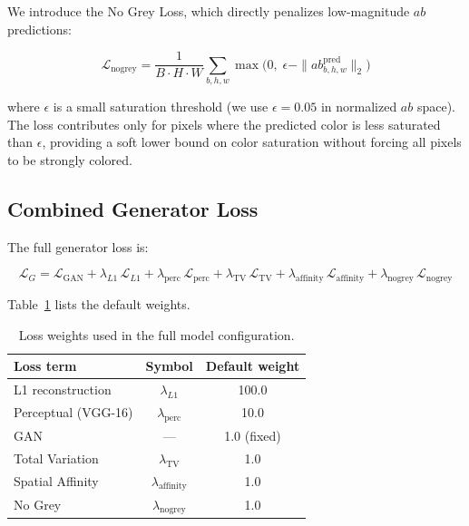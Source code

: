 \documentclass[12pt, a4paper, oneside]{report}
\begin{document}
    We introduce the No Grey Loss, which directly penalizes low-magnitude $ab$
    predictions:

    \begin{equation}
        \mathcal{L}_{\text{nogrey}} =
        \frac{1}{B \cdot H \cdot W}
        \sum_{b,h,w} \max\bigl(0,\; \epsilon - \|ab^{\text{pred}}_{b,h,w}\|_2\bigr)
    \end{equation}

    where $\epsilon$ is a small saturation threshold (we use $\epsilon = 0.05$ in
    normalized $ab$ space). The loss contributes only for pixels where the predicted
    color is less saturated than $\epsilon$, providing a soft lower bound on color
    saturation without forcing all pixels to be strongly colored.

    \subsection{Combined Generator Loss}

    The full generator loss is:

    \begin{equation}
        \mathcal{L}_G = \mathcal{L}_{\text{GAN}}
        + \lambda_{L1}\,\mathcal{L}_{L1}
        + \lambda_{\text{perc}}\,\mathcal{L}_{\text{perc}}
        + \lambda_{\text{TV}}\,\mathcal{L}_{\text{TV}}
        + \lambda_{\text{affinity}}\,\mathcal{L}_{\text{affinity}}
        + \lambda_{\text{nogrey}}\,\mathcal{L}_{\text{nogrey}}
    \end{equation}

    Table~\ref{tab:weights} lists the default weights.

    \begin{table}[H]
        \centering
        \caption{Loss weights used in the full model configuration.}
        \begin{tabular}{lcc}
            \toprule
            \textbf{Loss term} & \textbf{Symbol} & \textbf{Default weight} \\
            \midrule
            L1 reconstruction  & $\lambda_{L1}$             & 100.0 \\
            Perceptual (VGG-16) & $\lambda_{\text{perc}}$   & 10.0 \\
            GAN                & ---                         & 1.0 (fixed) \\
            Total Variation    & $\lambda_{\text{TV}}$       & 1.0 \\
            Spatial Affinity   & $\lambda_{\text{affinity}}$ & 1.0 \\
            No Grey            & $\lambda_{\text{nogrey}}$   & 1.0 \\
            \bottomrule
        \end{tabular}
        \label{tab:weights}
    \end{table}
\end{document}
